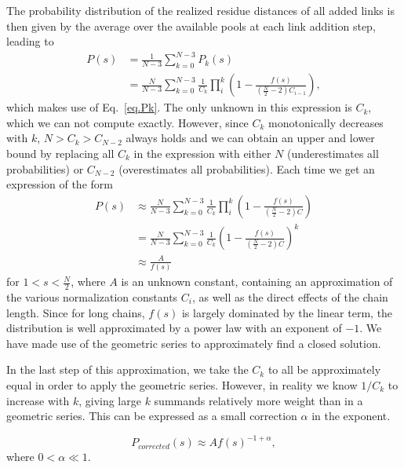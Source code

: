 \documentclass[
reprint,
twocolumn,
amsmath,amssymb,superscriptaddress,aps,
pre]{revtex4-1}
\begin{document}
The probability distribution of the realized residue distances of all added links is then given by the average over the available pools at each link addition step, leading to
\begin{align}
    P(s)&=\frac{1}{N-3}\sum_{k=0}^{N-3} P_k(s) \nonumber \\
    &= \frac{N}{N-3}\sum_{k=0}^{N-3} \frac{1}{C_k}\prod_{i}^k\left(1-\frac{f(s)}{(\frac{N}{2}-2)C_{i-1}} \right),
\end{align}
which makes use of Eq.~\ref{eq.Pk}. The only unknown in this expression is $C_k$, which we can not compute exactly. However, since $C_k$ monotonically decreases with $k$, $N>C_k>C_{N-2}$ always holds and we can obtain an upper and lower bound by replacing all $C_k$ in the expression with either $N$ (underestimates all probabilities) or $C_{N-2}$ (overestimates all probabilities). Each time we get an expression of the form 
\begin{align}
     P(s)&\approx\frac{N}{N-3}\sum_{k=0}^{N-3} \frac{1}{C_k}\prod_{i}^k\left(1-\frac{f(s)}{(\frac{N}{2}-2)C} \right)\nonumber \\
     &=\frac{N}{N-3} \sum_{k=0}^{N-3}\frac{1}{C_k}\left(1-\frac{f(s)}{(\frac{N}{2}-2)C} \right)^k \nonumber \\
     &\approx \frac{A}{f(s)}
\end{align}
for $1<s<\frac{N}{2}$,
where $A$ is an unknown constant, containing an approximation of the various normalization constants $C_i$, as well as the direct effects of the chain length. 
Since for long chains, $f(s)$ is largely dominated by the linear term, the distribution is well approximated by a power law with an exponent of $-1$. We have made use of the geometric series to approximately find a closed solution. 

In the last step of this approximation, we take the $C_k$ to all be approximately equal in order to apply the geometric series. However, in reality we know $1/C_k$ to increase with $k$, giving large $k$ summands relatively more weight than in a geometric series. This can be expressed as a small correction $\alpha$ in the exponent.

\begin{equation}
    P_{corrected}(s)\approx A f(s)^{-1+\alpha},
\end{equation}
where $0<\alpha \ll 1$.
\end{document}
